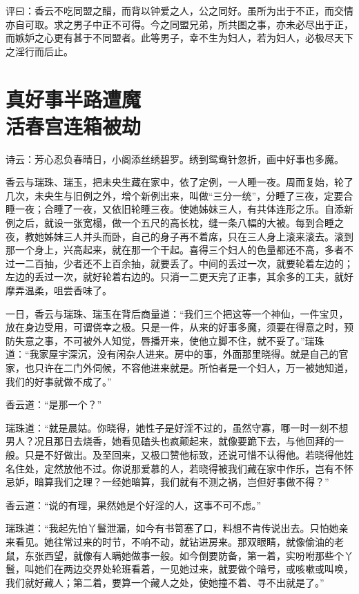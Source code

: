 \documentclass[a4paper,12pt,UTF8,twoside]{ctexbook}
\begin{document}
评曰：香云不吃同盟之醋，而背以钟爱之人，公之同好。虽所为出于不正，而交情亦自可取。求之男子中正不可得。今之同盟兄弟，所共图之事，亦未必尽出于正，而嫉妒之心更有甚于不同盟者。此等男子，幸不生为妇人，若为妇人，必极尽天下之淫行而后止。

\chapter[真好事半路遭魔\ 活春宫连箱被劫]{真好事半路遭魔\\活春宫连箱被劫}

诗云：芳心忍负春晴日，小阁添丝绣碧罗。绣到鸳鸯针忽折，画中好事也多魔。

香云与瑞珠、瑞玉，把未央生藏在家中，依了定例，一人睡一夜。周而复始，轮了几次，未央生与旧例之外，增个新例出来，叫做“三分一统”，分睡了三夜，定要合睡一夜；合睡了一夜，又依旧轮睡三夜。使她姊妹三人，有共体连形之乐。自添新例之后，就设一张宽榻，做一个五尺的高长枕，缝一条八幅的大被。每到合睡之夜，教她姊妹三人并头而卧，自己的身子再不着席，只在三人身上滚来滚去。滚到那一个身上，兴高起来，就在那一个干起。喜得三个妇人的色量都还不高，多者不过一二百抽，少者还不上百余抽，就要丢了。中间的丢过一次，就要轮着左边的；左边的丢过一次，就好轮着右边的。只消一二更天完了正事，其余多的工夫，就好摩弄温柔，咀尝香味了。

一日，香云与瑞珠、瑞玉在背后商量道：“我们三个把这等一个神仙，一件宝贝，放在身边受用，可谓侥幸之极。只是一件，从来的好事多魔，须要在得意之时，预防失意之事，不可被外人知觉，唇播开来，使他立脚不住，就不妥了。”瑞珠道：“我家屋宇深沉，没有闲杂人进来。房中的事，外面那里晓得。就是自己的官家，也只许在二门外伺候，不容他进来就是。所怕者是一个妇人，万一被她知道，我们的好事就做不成了。”

香云道：“是那一个？”

瑞珠道：“就是晨姑。你晓得，她性子是好淫不过的，虽然守寡，哪一时一刻不想男人？况且那日去烧香，她看见磕头也疯颠起来，就像要跪下去，与他回拜的一般。只是不好做出。及至回来，又极口赞他标致，还说可惜不认得他。若晓得他姓名住处，定然放他不过。你说那爱慕的人，若晓得被我们藏在家中作乐，岂有不怀忌妒，暗算我们之理？一经她暗算，我们就有不测之祸，岂但好事做不得？”

香云道：“说的有理，果然她是个好淫的人，这事不可不虑。”

瑞珠道：“我起先怕丫鬟泄漏，如今有书笥塞了口，料想不肯传说出去。只怕她亲来看见。她往常过来的时节，不响不动，就钻进房来。那双眼睛，就像偷油的老鼠，东张西望，就像有人瞒她做事一般。如今倒要防备，第一着，实吩咐那些个丫鬟，叫她们在两边交界处轮班看着，一见她过来，就要做个暗号，或咳嗽或叫唤，我们就好藏人；第二着，要算一个藏人之处，使她撞不着、寻不出就是了。”
\end{document}
